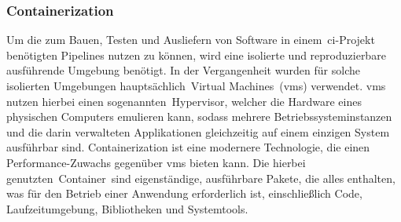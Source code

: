 \subsubsection{Containerization}

Um die zum Bauen, Testen und Ausliefern von Software in einem\ \acrshort{ci}-Projekt benötigten Pipelines nutzen zu
können, wird eine isolierte und reproduzierbare ausführende Umgebung benötigt.
In der Vergangenheit wurden für solche isolierten Umgebungen hauptsächlich\ \glqq Virtual
Machines\grqq\ (\acrshort{vm}s) verwendet.
\acrshort{vm}s nutzen hierbei einen sogenannten\ \glqq Hypervisor\grqq, welcher die Hardware eines physischen Computers
emulieren kann, sodass mehrere Betriebssysteminstanzen und die darin verwalteten Applikationen gleichzeitig auf einem
einzigen System ausführbar sind.
Containerization ist eine modernere Technologie, die einen Performance-Zuwachs gegenüber \acrshort{vm}s bieten kann.
Die hierbei genutzten\ \glqq Container\grqq\ sind eigenständige, ausführbare Pakete, die alles enthalten, was für den
Betrieb einer Anwendung erforderlich ist, einschließlich Code, Laufzeitumgebung, Bibliotheken und Systemtools.

